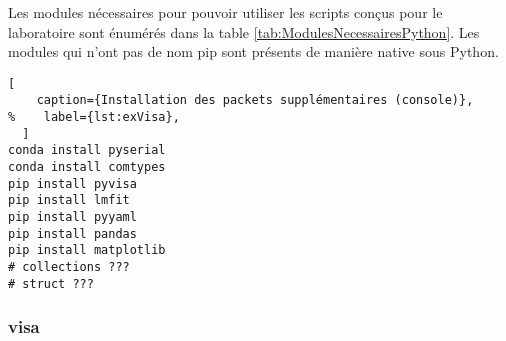 \documentclass[11pt,francais]{book} %
\begin{document}
Les modules nécessaires pour pouvoir utiliser les scripts con\c{c}us pour le laboratoire sont énumérés dans la table \ref{tab:ModulesNecessairesPython}.
Les modules qui n'ont pas de nom pip sont présents de manière native sous Python.

\begin{table}[htb]
  \caption{Modules nécessaires au fonctionnement des scripts du laboratoire}
  \label{tab:ModulesNecessairesPython}
  \centering
\end{table}

\begin{lstlisting}[
    caption={Installation des packets supplémentaires (console)},
%    label={lst:exVisa},
  ]
conda install pyserial
conda install comtypes
pip install pyvisa
pip install lmfit
pip install pyyaml
pip install pandas
pip install matplotlib
# collections ???
# struct ???
\end{lstlisting}


\subsubsection{visa}
\end{document}
